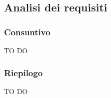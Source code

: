 
	\subsection{Analisi dei requisiti} %
	\label{sub:analisi_dei_requisiti}
		\subsubsection{Consuntivo} %
		\label{ssub:consuntivo}
		TO DO
	
		\subsubsection{Riepilogo} %
		\label{ssub:riepilogo}
		TO DO
		

